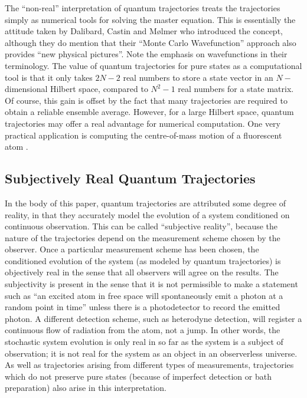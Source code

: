 \documentclass[12pt]{article}
\begin{document}
The ``non-real'' interpretation of quantum trajectories treats the 
trajectories simply as numerical tools for solving the master equation.
This is essentially the attitude taken by Dalibard, Castin and M\o lmer 
\cite{DalCasMol92} who introduced the concept, although they do mention that their 
``Monte Carlo Wavefunction''  approach also provides ``new physical 
pictures''. Note the emphasis on wavefunctions in their terminology.
The value of quantum trajectories for pure states as a computational tool 
is that it only takes $2N-2$ real numbers to store a state vector in an 
$N-$dimensional Hilbert space, compared to $N^2-1$ real numbers for a state 
matrix. Of course, this gain is offset by the fact that many trajectories 
are required to obtain a reliable ensemble average. However, for a large 
Hilbert space, quantum trajectories may offer a real advantage for 
numerical computation. One very practical application is computing 
the centre-of-mass motion of a fluorescent atom
\cite{MolCasDal93,DumZolRit92,MarDumTaiZol93,Mar93,HolMarMarZol95}. 

\subsection{Subjectively Real Quantum Trajectories}

In the body of this paper, quantum trajectories are attributed some degree of 
reality, in that they accurately model the evolution of a system conditioned on 
continuous observation. This can be called ``subjective reality'', 
because the nature of the trajectories depend on the measurement scheme 
chosen by the observer. Once a particular measurement scheme has been
chosen, the conditioned evolution of the system (as modeled by quantum trajectories)
is objectively real in the sense that all observers will agree on the results. The
subjectivity is present in the sense that it is not permissible to make a
statement such as ``an excited atom in free space will spontaneously emit a photon
at a random point in time'' unless there is a photodetector to record the emitted
photon. A different detection scheme, such as heterodyne detection, will register
a continuous flow of radiation from the atom, not a jump. In other words, the
stochastic system evolution is only real in so far as the system is a subject of
observation; it is not real for the system as an object in an observerless universe.
As well as trajectories arising from different types of measurements, trajectories
which do not preserve pure  states (because of imperfect detection or bath
preparation) also arise in this interpretation.  
\end{document}
